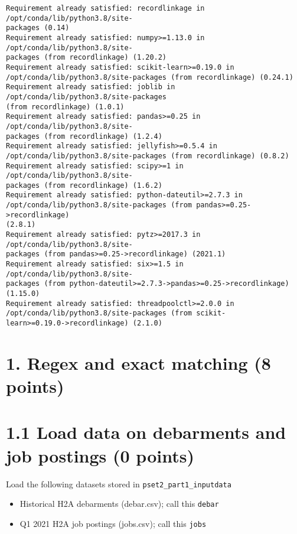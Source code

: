 \documentclass[11pt]{article}
\providecommand{\tightlist}{%
      \setlength{\itemsep}{0pt}\setlength{\parskip}{0pt}}
\begin{document}
    \begin{Verbatim}[commandchars=\\\{\}]
Requirement already satisfied: recordlinkage in /opt/conda/lib/python3.8/site-
packages (0.14)
Requirement already satisfied: numpy>=1.13.0 in /opt/conda/lib/python3.8/site-
packages (from recordlinkage) (1.20.2)
Requirement already satisfied: scikit-learn>=0.19.0 in
/opt/conda/lib/python3.8/site-packages (from recordlinkage) (0.24.1)
Requirement already satisfied: joblib in /opt/conda/lib/python3.8/site-packages
(from recordlinkage) (1.0.1)
Requirement already satisfied: pandas>=0.25 in /opt/conda/lib/python3.8/site-
packages (from recordlinkage) (1.2.4)
Requirement already satisfied: jellyfish>=0.5.4 in
/opt/conda/lib/python3.8/site-packages (from recordlinkage) (0.8.2)
Requirement already satisfied: scipy>=1 in /opt/conda/lib/python3.8/site-
packages (from recordlinkage) (1.6.2)
Requirement already satisfied: python-dateutil>=2.7.3 in
/opt/conda/lib/python3.8/site-packages (from pandas>=0.25->recordlinkage)
(2.8.1)
Requirement already satisfied: pytz>=2017.3 in /opt/conda/lib/python3.8/site-
packages (from pandas>=0.25->recordlinkage) (2021.1)
Requirement already satisfied: six>=1.5 in /opt/conda/lib/python3.8/site-
packages (from python-dateutil>=2.7.3->pandas>=0.25->recordlinkage) (1.15.0)
Requirement already satisfied: threadpoolctl>=2.0.0 in
/opt/conda/lib/python3.8/site-packages (from scikit-
learn>=0.19.0->recordlinkage) (2.1.0)
    \end{Verbatim}

    \hypertarget{regex-and-exact-matching-8-points}{%
\section{1. Regex and exact matching (8
points)}\label{regex-and-exact-matching-8-points}}

    \hypertarget{load-data-on-debarments-and-job-postings-0-points}{%
\section{1.1 Load data on debarments and job postings (0
points)}\label{load-data-on-debarments-and-job-postings-0-points}}

Load the following datasets stored in \texttt{pset2\_part1\_inputdata}

\begin{itemize}
\tightlist
\item
  Historical H2A debarments (debar.csv); call this \texttt{debar}
\item
  Q1 2021 H2A job postings (jobs.csv); call this \texttt{jobs}
\end{itemize}
\end{document}
